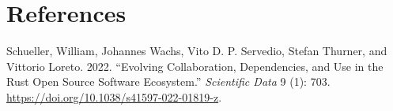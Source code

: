 \documentclass[
  12pt,
]{article}
\newlength{\cslhangindent}
\newenvironment{CSLReferences}[2] %
 {\begin{list}{}{%
  \setlength{\itemindent}{0pt}
  \setlength{\leftmargin}{0pt}
  \setlength{\parsep}{0pt}
  \ifodd #1
   \setlength{\leftmargin}{\cslhangindent}
   \setlength{\itemindent}{-1\cslhangindent}
  \fi
  \setlength{\itemsep}{#2\baselineskip}}}
 {\end{list}}
\begin{document}
\section{References}\label{sec-references}

\label{refs}
\begin{CSLReferences}{1}{0}
Schueller, William, Johannes Wachs, Vito D. P. Servedio, Stefan Thurner,
and Vittorio Loreto. 2022. {``Evolving Collaboration, Dependencies, and
Use in the Rust Open Source Software Ecosystem.''} \emph{Scientific
Data} 9 (1): 703. \url{https://doi.org/10.1038/s41597-022-01819-z}.

\end{CSLReferences}
\end{document}
